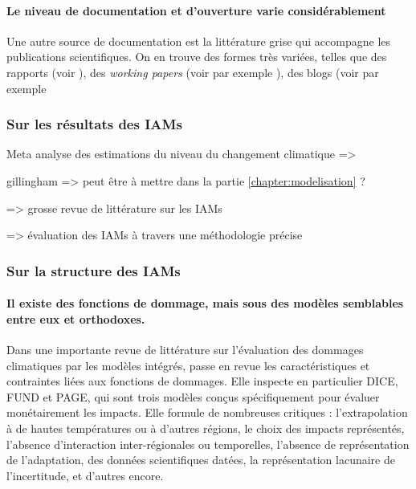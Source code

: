 \paragraph{Le niveau de documentation et d'ouverture varie considérablement}

Une autre source de documentation est la littérature grise qui accompagne les publications scientifiques. On en trouve des formes très variées, telles que des rapports (voir \cite{medeas_guiding_2019, asbjorn_aaheim_grace_2018, european_commission_ginfors-e_2022, european_commission_gem-e3_2013, nordhaus_dice_2013}), des \emph{working papers} (voir par exemple \cite{dafermos_stock-flow-fund_2017, giraud_coping_2016, calvin_gcam_2019, bosetti_witch_2006, ghersi_imaclim-p_2014}), des blogs (voir par exemple \cite{tol}

\paragraph{}

\subsubsection{Sur les résultats des IAMs}





Meta analyse des estimations du niveau du changement climatique
\cite{howard_few_2017} => 

\cite{gillingham_modeling_2018} gillingham => peut être à mettre dans la partie \ref{chapter:modelisation} ?

\cite{keppo_exploring_2021} => grosse revue de littérature sur les IAMs

\cite{harmsen_integrated_2021} => évaluation des IAMs à travers une méthodologie précise




\subsubsection{Sur la structure des IAMs }

\paragraph{Il existe des fonctions de dommage, mais sous des modèles semblables entre eux et orthodoxes.}

Dans une importante revue de littérature sur l'évaluation des dommages climatiques par les modèles intégrés, \cite{diaz_quantifying_2017} passe en revue les caractéristiques et contraintes liées aux fonctions de dommages. Elle inspecte en particulier DICE, FUND et PAGE, qui sont trois modèles conçus spécifiquement pour évaluer monétairement les impacts. Elle formule de nombreuses critiques : l'extrapolation à de hautes températures ou à d'autres régions, le choix des impacts représentés, l'absence d'interaction inter-régionales ou temporelles, l'absence de représentation de l'adaptation, des données scientifiques datées, la représentation lacunaire de l'incertitude, et d'autres encore. 

